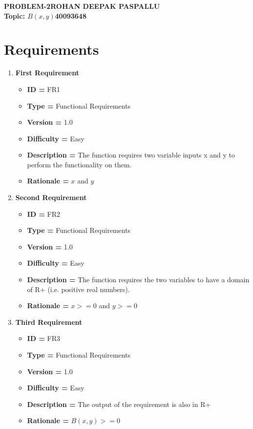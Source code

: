\documentclass{report}
\begin{document}
\Large\textbf{PROBLEM-2}\hfill\textbf{ROHAN DEEPAK PASPALLU}\\
\textbf{Topic: $B(x,y)$}\hfill\textbf{40093648}
    \section*{Requirements}
    \begin{enumerate}[noitemsep]
        \item \textbf{First Requirement}
        \begin{itemize}[noitemsep]
            \item \textbf{ID = } FR1
            \item\textbf{Type = } Functional Requirements
            \item\textbf{Version = } 1.0
            \item\textbf{Difficulty = } Easy
            \item\textbf{Description = } The function requires two variable inputs x and y to perform the functionality on them.
            \item\textbf{Rationale = } $x$ and $y$ 
        \end{itemize}

        \item \textbf{Second Requirement}
        \begin{itemize}
            \item \textbf{ID = } FR2
            \item\textbf{Type = } Functional Requirements
            \item\textbf{Version = } 1.0
            \item\textbf{Difficulty = } Easy
            \item\textbf{Description = } The function requires the two variables to have a domain of R+ (i.e. positive real numbers).
            \item\textbf{Rationale = } $x>=0$ and $y>=0$ 
        \end{itemize}
        \item \textbf{Third Requirement}
        \begin{itemize}
            \item \textbf{ID = } FR3
            \item\textbf{Type = } Functional Requirements
            \item\textbf{Version = } 1.0
            \item\textbf{Difficulty = } Easy
            \item\textbf{Description = } The output of the requirement is also in R+
            \item\textbf{Rationale = } $B(x,y)>=0$ 
        \end{itemize}
        

\end{enumerate}
\end{document}
